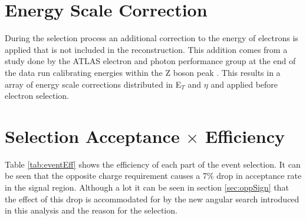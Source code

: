 \section{Energy Scale Correction}

   During the selection process an additional correction to the energy of electrons is applied that is not included in the reconstruction. This addition comes from a study done by the ATLAS electron and photon performance group at the end of the data run calibrating energies within the Z boson peak \cite{ATLAS-CONF-2014-032}. This results in a array of energy scale corrections distributed in E$_{T}$ and $\eta$ and applied before electron selection.




\section{\texorpdfstring{Selection Acceptance $\times$ Efficiency}{Selection Acceptance x Efficiency}}

   Table \ref{tab:eventEff} shows the efficiency of each part of the event selection. It can be seen that the opposite charge requirement causes a 7\% drop in acceptance rate in the signal region. Although a lot it can be seen in section \ref{sec:oppSign} that the effect of this drop is accommodated for by the new angular search introduced in this analysis and the reason for the selection.






